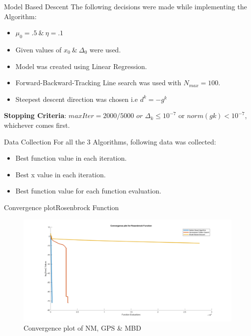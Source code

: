 \documentclass[10pt]{beamer}
\begin{document}
	\begin{frame}{Model Based Descent}
		The following decisions were made while implementing the Algorithm: \\
		
		\begin{itemize}
			\item $\mu_0=.5 \ \& \ \eta = .1$  
			\item Given values of $x_0 \ \& \ \Delta_0$ were used.
			\item Model was created using Linear Regression.
			\item Forward-Backward-Tracking Line search was used with $N_{max} = 100$. 
			\item Steepest descent direction was chosen i.e $d^k = -g^k$  
		\end{itemize}
		
		\textbf{Stopping Criteria}:
		$maxIter = 2000/5000$ 		$or$	 $ \Delta_k \leq 10^{-7}$ or $norm(gk) < 10^{-7}$, whichever comes first.
	\end{frame}

	\begin{frame}{Data Collection}
		For all the 3 Algorithms, following data was collected: \\
		\begin{itemize}
			\item Best function value in each iteration.
			\item Best x value in each iteration.
			\item Best function value for each function evaluation.
		\end{itemize}
	\end{frame}
	
	\begin{frame}{Convergence plot}{Rosenbrock Function}
		\begin{figure}
			\includegraphics[width=\linewidth]{RosenbrockConvF.jpg}
			\caption{Convergence plot of NM, GPS \& MBD}
		\end{figure}
	\end{frame}
	
\end{document}
